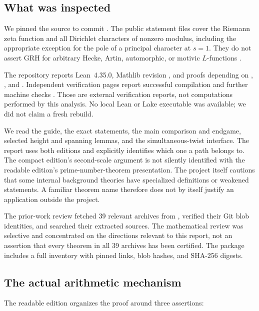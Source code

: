 \subsection{What was inspected}

We pinned the source to commit
. The public statement files
cover the Riemann zeta function and all Dirichlet characters of nonzero
modulus, including the appropriate exception for the pole of a principal
character at \(s=1\). They do not assert GRH for arbitrary Hecke, Artin,
automorphic, or motivic \(L\)-functions \cite{repo}.

The repository reports Lean~4.35.0, Mathlib revision
, and proofs depending on
, , and .
Independent verification pages report successful compilation and further
machine checks \cite{sutherland,rubinstein}. Those are external verification
reports, not computations performed by this analysis. No local Lean or Lake
executable was available; we did not claim a fresh rebuild.

We read the guide, the exact statements, the main comparison and endgame,
selected height and spanning lemmas, and the simultaneous-twist interface.
The report uses both editions and explicitly identifies which one a path
belongs to. The compact edition's second-scale argument is not silently
identified with the readable edition's prime-number-theorem presentation.
The project itself cautions that some internal background theories have
specialized definitions or weakened statements. A familiar theorem name
therefore does not by itself justify an application outside the project.

The prior-work review fetched 39 relevant archives from
, verified their Git blob identities, and searched their
extracted sources. The mathematical review was selective and concentrated
on the directions relevant to this report, not an assertion that every
theorem in all 39 archives has been certified. The package includes a full
inventory with pinned links, blob hashes, and SHA-256 digests.

\subsection{The actual arithmetic mechanism}

The readable edition organizes the proof around three assertions:

